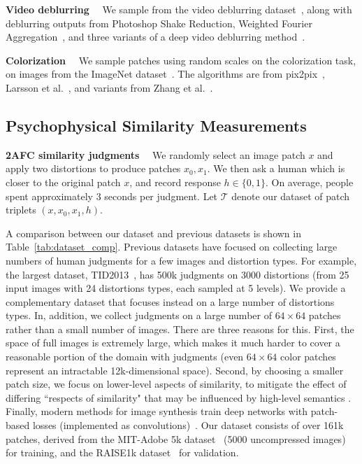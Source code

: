   \textbf{Video deblurring} \ \  We sample from the video deblurring dataset~\cite{Su_2017_CVPR}, along with deblurring outputs from Photoshop Shake Reduction, Weighted Fourier Aggregation~\cite{delbracio2015hand}, and three variants of a deep video deblurring method~\cite{Su_2017_CVPR}.

  \textbf{Colorization} \ \  We sample patches using random scales on the colorization task, on images from the ImageNet dataset~\cite{russakovsky2015imagenet}. The algorithms are from pix2pix~\cite{isola2015learning}, Larsson et al.~\cite{larsson2016learning}, and variants from Zhang et al.~\cite{zhang2016colorful}.

\subsection{Psychophysical Similarity Measurements}

  \textbf{2AFC similarity judgments} \ \ 
We randomly select an image patch $x$ and apply two distortions to produce patches $x_0, x_1$. We then ask a human which is closer to the original patch $x$, and record response $h \in \{0,1\}$. On average, people spent approximately 3 seconds per judgment. Let $\mathcal{T}$ denote our dataset of patch triplets $(x, x_0, x_1, h)$.

A comparison between our dataset and previous datasets is shown in Table~\ref{tab:dataset_comp}. 
Previous datasets have focused on collecting large numbers of human judgments for a few images and distortion types. For example, the largest dataset, TID2013~\cite{ponomarenko2015image}, has 500k judgments on 3000 distortions (from 25 input images with 24 distortions types, each sampled at 5 levels). We provide a complementary dataset that focuses instead on a large number of distortions types. In, addition, we collect judgments on a large number of $64\times 64$ patches rather than a small number of images. There are three reasons for this. First, the space of full images is extremely large, which makes it much harder to cover a reasonable portion of the domain with judgments (even $64\times 64$ color patches represent an intractable 12k-dimensional space). Second, by choosing a smaller patch size, we focus on lower-level aspects of similarity, to mitigate the effect of differing ``respects of similarity" that may be influenced by high-level semantics \cite{medin1993respects}. Finally, modern methods for image synthesis train deep networks with patch-based losses (implemented as convolutions)~\cite{chen2017photographic,isola2017image}. Our dataset consists of over 161k patches, derived from the MIT-Adobe 5k dataset~\cite{fivek} (5000 uncompressed images) for training, and the RAISE1k dataset~\cite{dang2015raise} for validation.

